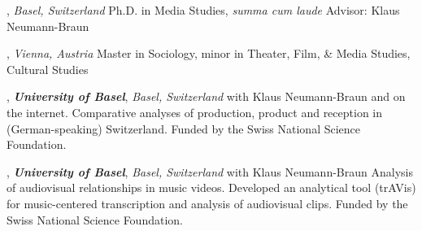 \documentclass[9pt]{article}
\begin{document}

, \emph{Basel, Switzerland} \vspace{0.01in} 
\newline Ph.D. in Media Studies, {\em summa cum laude}
\newline Advisor: Klaus Neumann-Braun
\bigskip

, \emph{Vienna, Austria} \vspace{0.01in}  
\newline\noindent Master in Sociology, minor in Theater, Film, \& Media Studies, Cultural Studies
\bigskip


\medskip
{}

, {\bf \em University of Basel}, \emph{Basel, Switzerland} \vspace{0.01in} 
\newline{}
\newline\noindent with Klaus Neumann-Braun \vspace{0.3em} 
\newline{} 
\newline\noindent and on the internet. Comparative analyses of production, 
\newline\noindent product and reception in (German-speaking) Switzerland. 
\newline\noindent Funded by the Swiss National Science Foundation.
\bigskip

, {\bf \em University of Basel}, \emph{Basel, Switzerland} \vspace{0.01in} 
\newline\noindent with Klaus Neumann-Braun \vspace{0.3em} 
\newline{} 
\newline\noindent Analysis of audiovisual relationships in music videos. 
\newline\noindent Developed an analytical tool (trAVis) for music-centered 
\newline\noindent transcription and analysis of audiovisual clips.
\newline\noindent Funded by the Swiss National Science Foundation.
\bigskip
\end{document}

